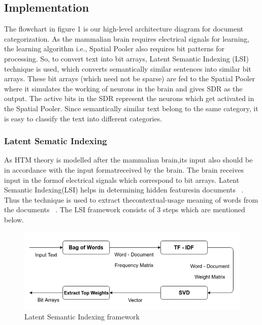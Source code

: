 \documentclass[12pt]{article}
\begin{document}
\begin{multicols}{2}
\subsection{Implementation}
The flowchart in figure 1 is our high-level architecture
diagram for document categorization. As the mammalian brain
requires electrical signals for learning, the learning algorithm
i.e., Spatial Pooler also requires bit patterns for processing.
So, to convert text into bit arrays, Latent Semantic Indexing
(LSI) technique is used, which converts semantically similar
sentences into similar bit arrays. These bit arrays (which need
not be sparse) are fed to the Spatial Pooler where it simulates
the working of neurons in the brain and gives SDR as the
output. The active bits in the SDR represent the neurons which
get activated in the Spatial Pooler. Since semantically similar
text belong to the same category, it is easy to classify the text
into different categories.

\subsubsection{Latent Sematic Indexing}
As HTM theory is modelled after the mammalian brain,its input also should be in accordance with the input formatreceived by the brain. The brain receives input in the formof electrical signals which correspond to bit arrays. Latent
Semantic Indexing(LSI) helps in determining hidden featuresin documents ~\cite{10}. Thus the technique is used to extract thecontextual-usage meaning of words from the documents ~\cite{11}.
The LSI framework consists of 3 steps which are mentioned below.
\end{multicols}
\begin{figure}[h]
\begin{center}
\includegraphics[scale=0.38]{image2.png}
\caption{Latent Semantic Indexing framework}
\end{center}
\end{figure}
\end{document}
